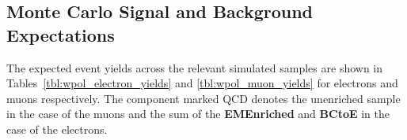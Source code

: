 \subsection{Monte Carlo Signal and Background Expectations}
The expected event yields across the relevant simulated samples are shown in
Tables~\ref{tbl:wpol_electron_yields} and \ref{tbl:wpol_muon_yields} for
electrons and muons respectively. The component marked \ac{QCD} denotes the
unenriched sample in the case of the muons and the sum of the
\textbf{EMEnriched} and \textbf{BCtoE} in the case of the electrons.






